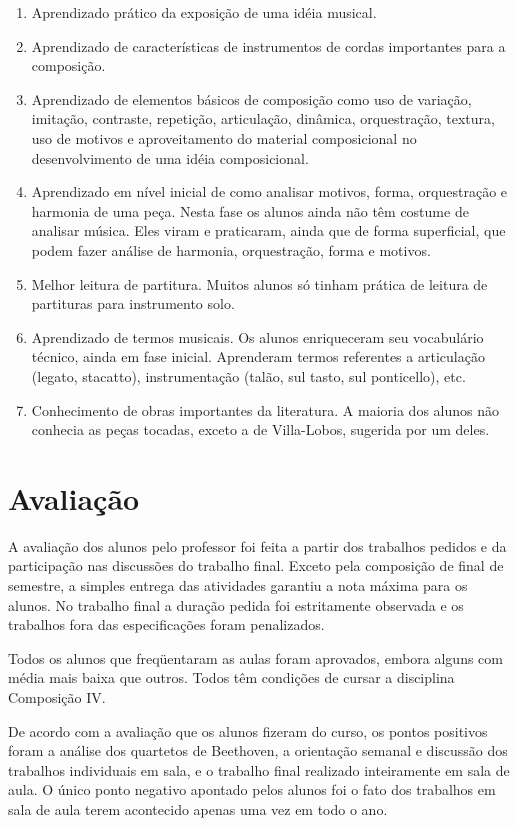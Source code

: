 \documentclass[12pt]{article}
\begin{document}
\begin{enumerate}
\item Aprendizado prático da exposição de uma idéia musical.
\item Aprendizado de características de instrumentos de cordas
  importantes para a composição.
\item Aprendizado de elementos básicos de composição como uso de
  variação, imitação, contraste, repetição, articulação, dinâmica,
  orquestração, textura, uso de motivos e aproveitamento do material
  composicional no desenvolvimento de uma idéia composicional.
\item Aprendizado em nível inicial de como analisar motivos, forma,
  orquestração e harmonia de uma peça. Nesta fase os alunos ainda não
  têm costume de analisar música. Eles viram e praticaram, ainda que
  de forma superficial, que podem fazer análise de harmonia,
  orquestração, forma e motivos.
\item Melhor leitura de partitura. Muitos alunos só tinham prática de
  leitura de partituras para instrumento solo.
\item Aprendizado de termos musicais. Os alunos enriqueceram seu
  vocabulário técnico, ainda em fase inicial. Aprenderam termos
  referentes a articulação (legato, stacatto), instrumentação (talão,
  sul tasto, sul ponticello), etc.
\item Conhecimento de obras importantes da literatura. A maioria dos
  alunos não conhecia as peças tocadas, exceto a de Villa-Lobos,
  sugerida por um deles.
\end{enumerate}

\section{Avaliação}
\label{sec:avaliacao}

A avaliação dos alunos pelo professor foi feita a partir dos trabalhos
pedidos e da participação nas discussões do trabalho final. Exceto
pela composição de final de semestre, a simples entrega das atividades
garantiu a nota máxima para os alunos. No trabalho final a duração
pedida foi estritamente observada e os trabalhos fora das
especificações foram penalizados.

Todos os alunos que freqüentaram as aulas foram aprovados, embora
alguns com média mais baixa que outros. Todos têm condições de cursar
a disciplina Composição IV.

De acordo com a avaliação que os alunos fizeram do curso, os pontos
positivos foram a análise dos quartetos de Beethoven, a orientação
semanal e discussão dos trabalhos individuais em sala, e o trabalho
final realizado inteiramente em sala de aula. O único ponto negativo
apontado pelos alunos foi o fato dos trabalhos em sala de aula terem
acontecido apenas uma vez em todo o ano.
\end{document}
